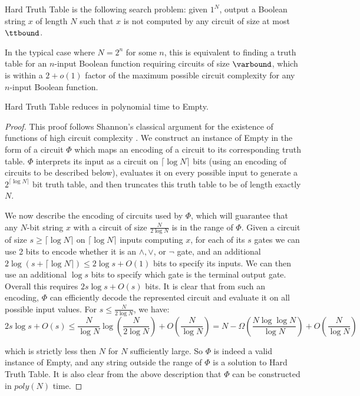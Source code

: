 \begin{definition}
{\sc Hard Truth Table} is the following search problem: given $1^N$, output a Boolean string $x$ of length $N$ such that $x$ is not computed by any circuit of size at most $\ttbound$.
\end{definition}
In the typical case where $N = 2^n$ for some $n$, this is equivalent to finding a truth table for an $n$-input Boolean function requiring circuits of size $\varbound$, which is within a $2 + o(1)$ factor of the maximum possible circuit complexity for any $n$-input Boolean function.

\begin{theorem}\label{thm:truth-tables-in-apepp}
{\sc Hard Truth Table} reduces in polynomial time to {\sc Empty}.
\end{theorem}
\begin{proof}
This proof follows Shannon's classical argument for the existence of functions of high circuit complexity \cite{Shannon}. We construct an instance of {\sc Empty} in the form of a circuit $\Phi$ which maps an encoding of a circuit to its corresponding truth table. $\Phi$ interprets its input as a circuit on $\lceil \log N \rceil$ bits (using an encoding of circuits to be described below), evaluates it on every possible input to generate a $2^{\lceil \log N \rceil}$ bit truth table, and then truncates this truth table to be of length exactly $N$.

We now describe the encoding of circuits used by $\Phi$, which will guarantee that any $N$-bit string $x$ with a circuit of size $\frac{N}{2\log N}$ is in the range of $\Phi$. Given a circuit of size $s \geq \lceil \log N \rceil $ on $\lceil \log N \rceil$ inputs computing $x$, for each of its $s$ gates we can use 2 bits to encode whether it is an $\land, \lor$, or $\lnot$ gate, and an additional $2\log (s+\lceil \log N \rceil) \leq 2\log s + O(1)$ bits to specify its inputs. We can then use an additional $\log s$ bits to specify which gate is the terminal output gate. Overall this requires $2s\log s + O(s)$ bits. It is clear that from such an encoding, $\Phi$ can efficiently decode the represented circuit and evaluate it on all possible input values. For $s \leq \frac{N}{2\log N}$, we have:
\[
2s\log s + O(s) \leq \frac{N}{\log N}\log\left(\frac{N}{2\log N}\right) + O\left(\frac{N}{\log N}\right) = N - \Omega\left(\frac{N\log\log N}{\log N}\right) + O\left(\frac{N}{\log N}\right)
\]

which is strictly less then $N$ for $N$ sufficiently large. So $\Phi$ is indeed a valid instance of {\sc Empty}, and any string outside the range of $\Phi$ is a solution to {\sc Hard Truth Table}. It is also clear from the above description that $\Phi$ can be constructed in $poly(N)$ time.


\end{proof}
